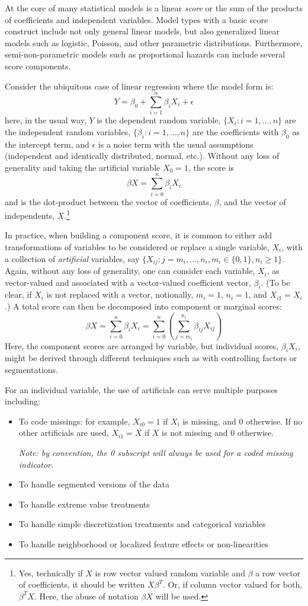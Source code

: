 \documentclass[10pt]{article}
\begin{document}
At the core of many statistical models is a linear {\em score} or the sum of the products of 
coefficients and independent variables. 
Model types with a basic score construct include not only general linear models, but also generalized linear models such as
logistic, Poisson, and other parametric distributions.  Furthermore, semi-non-parametric models such as proportional hazards 
can include several score components.  

Consider the ubiquitous case of linear regression where the model form is:
$$Y=\beta_0 + \sum_{i=1}^n \beta_iX_i + \epsilon $$
here, in the usual way, $Y$ is the dependent random variable, $\{X_i : i=1,\ldots,n\}$ are the independent random variables, 
$\{\beta_i: i=1,\ldots,n \}$ are the coefficients with $\beta_0$ as the intercept term, and $\epsilon$ is a noise term with the 
usual assumptions (independent and identically distributed, normal, etc.).  Without any loss of generality and taking the 
artificial variable $X_0=1$, the score is 
$$\beta X=\sum_{i=0}^n\beta_iX_i$$
and is the dot-product between the vector of coefficients, $\beta$,  and the vector of independents, $X$.\footnote{Yes, 
technically if $X$ is row vector valued random variable and $\beta$ a row vector of coefficients, it should be written $X\beta^T$.
Or, if column vector valued for both, $\beta^TX$.  Here, the abuse of notation $\beta X$ will be used.}

In practice, when building a component score, it is common to either add transformations of variables to be considered
or replace a single variable, $X_i$, with a collection of {\em artificial} variables, say $\{X_{ij} : j=m_i, \ldots, n_i, m_i \in \{0,1\}, n_i \ge 1\}$.
Again, without any loss of generality, one can consider each variable, $X_i$, as vector-valued and associated with a 
vector-valued coefficient vector, $\beta_i$. (To be clear, if $X_i$ is not replaced with a vector, notionally, $m_i=1$, $n_i=1$, and $X_{i1}=X_i$.)
A total score can then be decomposed into component or marginal scores:
$$\beta X=\sum_{i=0}^n\beta_iX_i=\sum_{i=0}^n\left({\sum_{j=m_i}^{n_i}\beta_{ij}X_{ij}}\right)$$
Here, the component scores are arranged by variable, but individual scores, $\beta_iX_i$, might be derived through different 
techniques such as with controlling factors or segmentations.

For an individual variable, the use of artificials can serve multiple purposes including:
\begin{itemize}
\item To code missings: for example, $X_{i0}=1$ if $X_i$ is missing, and 0 otherwise. If no
    other artificials are used, $X_{i1}=X$ if $X$ is not missing and 0 otherwise.\par
{\em Note: by convention, the 0 subscript will always be used for a coded missing indicator.}
\item To handle segmented versions of the data
\item To handle extreme value treatments
\item To handle simple discretization  treatments and categorical variables
\item To handle neighborhood or localized feature effects or non-linearities
\end{itemize}
\end{document}

